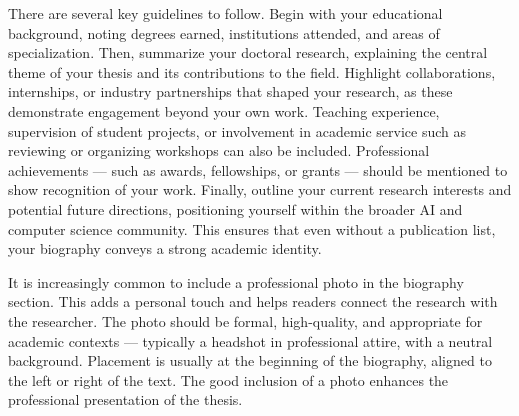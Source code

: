 \documentclass[PCOM,Thesis,Review]{mpThesis}
\begin{document}
\begin{Appendix}
\begin{Remark}
There are several key guidelines to follow.
Begin with your educational background, noting degrees earned, institutions attended, and areas of specialization.
Then, summarize your doctoral research, explaining the central theme of your thesis and its contributions to the field.
Highlight collaborations, internships, or industry partnerships that shaped your research, as these demonstrate engagement beyond your own work.
Teaching experience, supervision of student projects, or involvement in academic service such as reviewing or organizing workshops can also be included.
Professional achievements --- such as awards, fellowships, or grants --- should be mentioned to show recognition of your work.
Finally, outline your current research interests and potential future directions, positioning yourself within the broader AI and computer science community.
This ensures that even without a publication list, your biography conveys a strong academic identity.

It is increasingly common to include a professional photo in the biography section.
This adds a personal touch and helps readers connect the research with the researcher.
The photo should be formal, high-quality, and appropriate for academic contexts --- typically a headshot in professional attire, with a neutral background.
Placement is usually at the beginning of the biography, aligned to the left or right of the text.
The good inclusion of a photo enhances the professional presentation of the thesis.
\end{Remark}
\end{Appendix}
\end{document}
